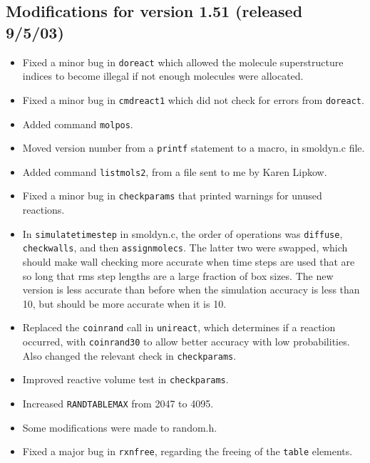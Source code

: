 \documentclass {book}
\begin{document}
\subsection*{Modifications for version 1.51 (released 9/5/03)}
\begin{itemize}
\item Fixed a minor bug in \texttt{doreact} which allowed the molecule superstructure indices to become illegal if not enough molecules were allocated.
\item Fixed a minor bug in \texttt{cmdreact1} which did not check for errors from \texttt{doreact}.
\item Added command \texttt{molpos}.
\item Moved version number from a \texttt{printf} statement to a macro, in smoldyn.c file.
\item Added command \texttt{listmols2}, from a file sent to me by Karen Lipkow.
\item Fixed a minor bug in \texttt{checkparams} that printed warnings for unused reactions.
\item In \texttt{simulatetimestep} in smoldyn.c, the order of operations was \texttt{diffuse}, \texttt{checkwalls}, and then \texttt{assignmolecs}. The latter two were swapped, which should make wall checking more accurate when time steps are used that are so long that rms step lengths are a large fraction of box sizes. The new version is less accurate than before when the simulation accuracy is less than 10, but should be more accurate when it is 10.
\item Replaced the \texttt{coinrand} call in \texttt{unireact}, which determines if a reaction occurred, with \texttt{coinrand30} to allow better accuracy with low probabilities. Also changed the relevant check in \texttt{checkparams}.
\item Improved reactive volume test in \texttt{checkparams}.
\item Increased \texttt{RANDTABLEMAX} from 2047 to 4095.
\item Some modifications were made to random.h.
\item Fixed a major bug in \texttt{rxnfree}, regarding the freeing of the \texttt{table} elements.
\end{itemize}
\end{document}

